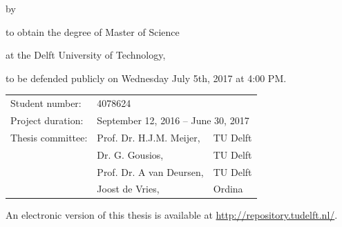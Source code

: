 \begin{titlepage}


\begin{center}

{\makeatletter

\largetitlestyle\color{tudelft-cyan}\fontsize{58}{58}
\makeatother}

{\makeatletter
\ifx\@subtitle\undefined\else
    \bigskip
   {\tudsffamily\fontsize{22}{32}\selectfont\@subtitle}    
\fi
\makeatother}

\bigskip
\bigskip

by

\bigskip
\bigskip

{\makeatletter
\largetitlestyle\fontsize{26}{26}\selectfont\@author
\makeatother}

\bigskip
\bigskip

to obtain the degree of Master of Science

at the Delft University of Technology,

to be defended publicly on Wednesday July 5th, 2017 at 4:00 PM.

\vfill

\begin{tabular}{lll}
    Student number:   & 4078624 \\
    Project duration: & \multicolumn{2}{l}{September 12, 2016 -- June 30, 2017} \\
    Thesis committee: & Prof. Dr. H.J.M. Meijer, & TU Delft \\
    				  & Dr. G. Gousios,          & TU Delft \\
    				  & Prof. Dr. A van Deursen, & TU Delft \\
    				  & Joost de Vries,          & Ordina
\end{tabular}

\bigskip
\bigskip
An electronic version of this thesis is available at \href{http://repository.tudelft.nl/}{http://repository.tudelft.nl/}.


\end{center}
\end{titlepage}
